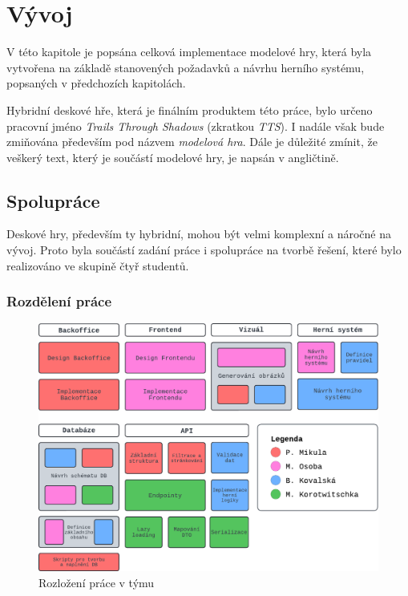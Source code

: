 \chapter{Vývoj}
\label{chap:development}

V této kapitole je popsána celková implementace modelové hry, která byla vytvořena na základě stanovených požadavků a návrhu herního systému, popsaných v předchozích kapitolách.

Hybridní deskové hře, která je finálním produktem této práce, bylo určeno pracovní jméno \textit{Trails Through Shadows} (zkratkou \textit{TTS}). I nadále však bude zmiňována především pod názvem \textit{modelová hra}. Dále je důležité zmínit, že veškerý text, který je součástí modelové hry, je napsán v angličtině.

\section{Spolupráce}
\label{sec:collaboration}

Deskové hry, především ty hybridní, mohou být velmi komplexní a náročné na vývoj. Proto byla součástí zadání práce i spolupráce na tvorbě řešení, které bylo realizováno ve skupině čtyř studentů.

\subsection{Rozdělení práce}
\label{subsec:job_distribution}

\begin{figure}[h]
    \centering
    \includegraphics[width=\textwidth]{../../shared/diagrams/blocks.pdf}
    \caption{Rozložení práce v týmu}
    \label{fig:job_distribution}
\end{figure}

